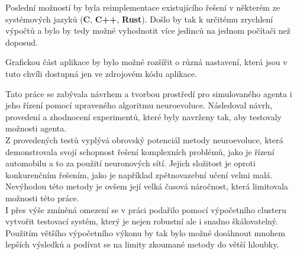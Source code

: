Poslední možností by byla reimplementace existujícího řešení v některém ze systémových jazyků (\textbf{C}, \textbf{C++}, \textbf{Rust}). Došlo by tak k určitému zrychlení výpočtů a bylo by tedy možné vyhodnotit více jedinců na jednom počítači než doposud. 

Grafickou část aplikace by bylo možné rozšířit o různá nastavení, která jsou v tuto chvíli dostupná jen ve zdrojovém kódu aplikace.

Tato práce se zabývala návrhem a  tvorbou prostředí pro simulovaného agenta i jeho řízení pomocí upraveného algoritmu neuroevoluce. Následoval návrh, provedení a zhodnocení experimentů, které byly navrženy tak, aby testovaly možnosti agenta.\\
Z provedených testů vyplývá obrovský potenciál metody neuroevoluce, která demonstrovala svojí schopnost řešení komplexních problémů, jako je řízení automobilu a to za použití neuronových sítí.  Jejich složitost je oproti konkurenčním řešením, jako je například zpětnovazební učení velmi malá.\\
Nevýhodou této metody je ovšem její velká časová náročnost, která limitovala možnosti této práce.\\
I přes výše zmíněná omezení se v práci podařilo pomocí výpočetního clusteru vytvořit testovací systém, který je nejen robustní ale i snadno škálovatelný. Použitím většího výpočetního výkonu by tak bylo možné dosáhnout mnohem lepších výsledků a podívat se na limity zkoumané metody do větší hloubky.